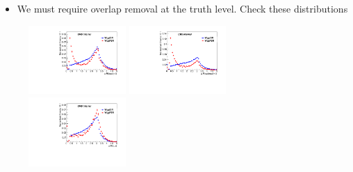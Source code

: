 \documentclass{beamer}
\begin{document}
 {

    \begin{itemize}
        \item We must require overlap removal at the truth level.  Check these distributions
    \end{itemize}

    \begin{figure}
        \includegraphics[width=0.33\textwidth]{Plots/lead_phot_lepDR_1l2p.pdf}
        \includegraphics[width=0.33\textwidth]{Plots/subl_phot_lepDR_1l2p.pdf}
        \includegraphics[width=0.33\textwidth]{Plots/phot_photDR_1l2p.pdf}
    \end{figure}

}
\end{document}
